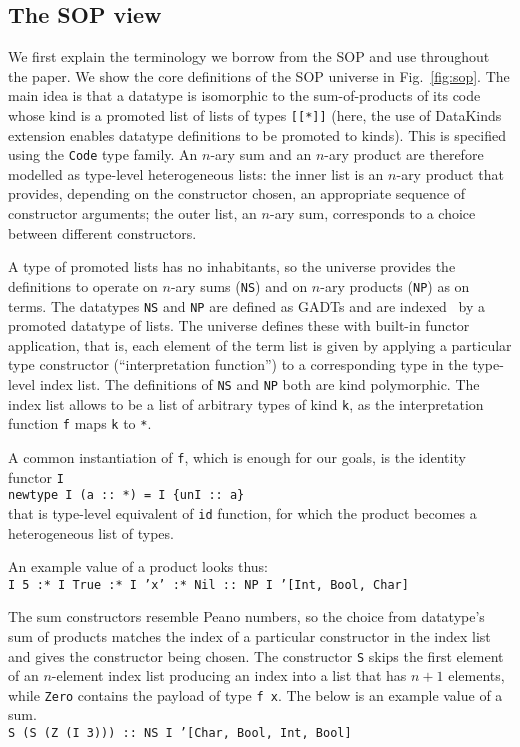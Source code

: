 \documentclass[acmsmall,review,anonymous]{acmart}\settopmatter{printfolios=true,printccs=false,printacmref=false}
\newcommand{\vs}{\vspace{0.2cm}\\}
\begin{document}
\subsection{The SOP view}

We first explain the terminology we borrow from the SOP and use throughout the paper. We show the core definitions of the SOP universe in Fig.~\ref{fig:sop}. The main idea is that a datatype is isomorphic to the sum-of-products of its code whose kind is a promoted list of lists of types \texttt{[[*]]} (here, the use of \textsf{DataKinds} extension enables datatype definitions to be promoted to kinds). This is specified using the \texttt{Code} type family. An $n$-ary sum and an $n$-ary product are therefore modelled as type-level heterogeneous lists: the inner list is an $n$-ary product that provides, depending on the constructor chosen, an appropriate sequence of constructor arguments; the outer list, an $n$-ary sum, corresponds to a choice between different constructors.

A type of promoted lists has no inhabitants, so the universe provides the definitions to operate on $n$-ary sums (\texttt{NS}) and on $n$-ary products (\texttt{NP}) as on terms. The datatypes \texttt{NS} and \texttt{NP} are defined as GADTs and are indexed~\citep{HiJeLo2004} by a promoted datatype of lists. The universe defines these with built-in functor application, that is, each element of the term list is given by applying a particular type constructor (``interpretation function'') to a corresponding type in the type-level index list. The definitions of \texttt{NS} and \texttt{NP} both are kind polymorphic. The index list allows to be a list of arbitrary types of kind \texttt{k}, as the interpretation function \texttt{f} maps \texttt{k} to \texttt{*}.

A common instantiation of \texttt{f}, which is enough for our goals, is the identity functor \texttt{I}
\texttt{
\vs
newtype I (a :: *) = I \{unI :: a\}
\vs
}
that is type-level equivalent of \texttt{id} function, for which the product becomes a heterogeneous list of types.

An example value of a product looks thus:
\texttt{
\vs
I 5 :* I True :* I 'x' :* Nil :: NP I '[Int, Bool, Char]
\vspace{0.2cm}
}

The sum constructors resemble Peano numbers, so the choice from datatype's sum of products matches the index of a particular constructor in the index list and gives the constructor being chosen. The constructor \texttt{S} skips the first element of an $n$-element index list producing an index into a list that has $n+1$ elements, while \texttt{Zero} contains the payload of type \texttt{f x}. The below is an example value of a sum.
\texttt{
\vs
S (S (Z (I 3))) :: NS I '[Char, Bool, Int, Bool]
}
\end{document}
